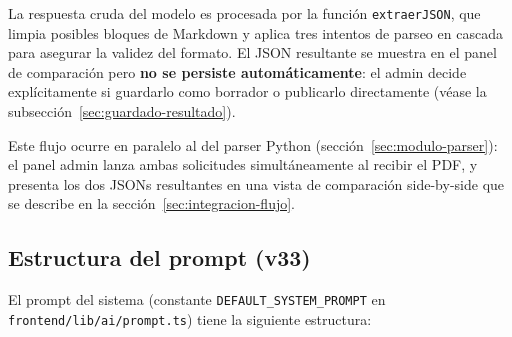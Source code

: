 \documentclass[12pt, a4paper]{report}
\begin{document}
La respuesta cruda del modelo es procesada por la función \texttt{extraerJSON}, que limpia
posibles bloques de Markdown y aplica tres intentos de parseo en cascada para asegurar la
validez del formato. El JSON resultante se muestra en el panel de comparación pero
\textbf{no se persiste automáticamente}: el admin decide explícitamente si guardarlo como
borrador o publicarlo directamente (véase la subsección~\ref{sec:guardado-resultado}).

Este flujo ocurre en paralelo al del parser Python (sección~\ref{sec:modulo-parser}): el
panel admin lanza ambas solicitudes simultáneamente al recibir el PDF, y presenta los dos
JSONs resultantes en una vista de comparación side-by-side que se describe en la
sección~\ref{sec:integracion-flujo}.

\subsection{Estructura del prompt (v33)}

El prompt del sistema (constante \texttt{DEFAULT\_SYSTEM\_PROMPT} en
\texttt{frontend/lib/ai/prompt.ts}) tiene la siguiente estructura:
\end{document}
